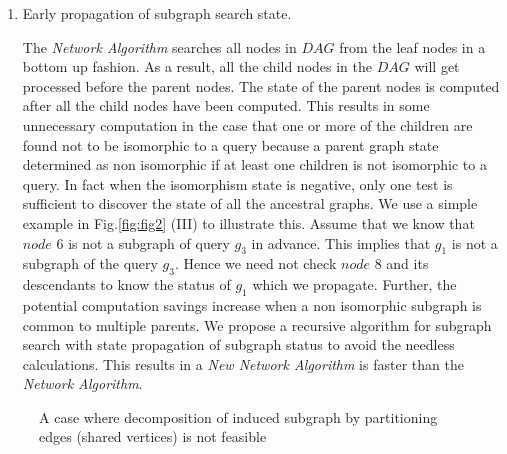 \begin{enumerate}
\begin{enumerate}

\item Early propagation of subgraph search state.

The \textit{Network Algorithm} searches all nodes in $DAG$ from the leaf nodes in a bottom up fashion.
As a result, all the child nodes in the $DAG$ will get processed before the parent nodes. The state of the parent nodes is computed after all the child nodes have been computed. This results in some unnecessary computation in the case that one or more of the children are found not to be isomorphic to a query because a parent graph state determined as non isomorphic if at least one children is not isomorphic to a query.  In fact when the isomorphism state is negative, only one test is sufficient to discover the state of all the ancestral graphs. We use a simple example in Fig.\ref{fig:fig2} (III) to illustrate this.
Assume that we know that $node$ 6 is not a subgraph of query $g_3$ in advance. This implies that $g_1$ is not a subgraph of the query $g_3$.
Hence we need not check $node$ 8 and its descendants to know the status of $g_1$ which we propagate. Further, the potential computation savings increase when a non isomorphic subgraph is common to multiple parents. We propose a recursive algorithm for subgraph search with state propagation of subgraph status to avoid the needless calculations. This results in a \textit{New Network Algorithm} is faster than the \textit{Network Algorithm}.
\end{enumerate}



\begin{figure}
\centering

\caption{A case where decomposition of induced subgraph by partitioning edges (shared vertices) is not feasible \label{fig:fig51} }
\end{figure}



\end{enumerate}
